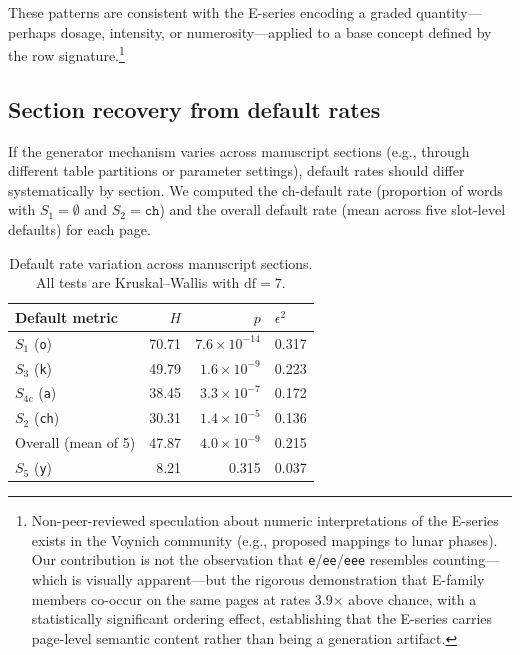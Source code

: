 \documentclass[12pt]{article}
\begin{document}
These patterns are consistent with the E-series encoding a graded quantity---perhaps dosage, intensity, or numerosity---applied to a base concept defined by the row signature.\footnote{Non-peer-reviewed speculation about numeric interpretations of the E-series exists in the Voynich community (e.g., proposed mappings to lunar phases). Our contribution is not the observation that \texttt{e}/\texttt{ee}/\texttt{eee} resembles counting---which is visually apparent---but the rigorous demonstration that E-family members co-occur on the same pages at rates 3.9$\times$ above chance, with a statistically significant ordering effect, establishing that the E-series carries page-level semantic content rather than being a generation artifact.}

\subsection{Section recovery from default rates}
\label{sec:bridging}

If the generator mechanism varies across manuscript sections (e.g., through different table partitions or parameter settings), default rates should differ systematically by section. We computed the ch-default rate (proportion of words with $S_1 = \emptyset$ and $S_2 = \texttt{ch}$) and the overall default rate (mean across five slot-level defaults) for each page.

\begin{table}[ht]
\centering
\caption{Default rate variation across manuscript sections. All tests are Kruskal--Wallis with $\text{df} = 7$.}
\label{tab:sections}
\begin{tabular}{lrrl}
\toprule
Default metric & $H$ & $p$ & $\epsilon^2$ \\
\midrule
$S_1$ (\texttt{o})        & 70.71 & $7.6 \times 10^{-14}$ & 0.317 \\
$S_3$ (\texttt{k})        & 49.79 & $1.6 \times 10^{-9}$  & 0.223 \\
$S_{4c}$ (\texttt{a})     & 38.45 & $3.3 \times 10^{-7}$  & 0.172 \\
$S_2$ (\texttt{ch})       & 30.31 & $1.4 \times 10^{-5}$  & 0.136 \\
Overall (mean of 5) & 47.87 & $4.0 \times 10^{-9}$  & 0.215 \\
$S_5$ (\texttt{y})        &  8.21 & 0.315                  & 0.037 \\
\bottomrule
\end{tabular}
\end{table}
\end{document}
